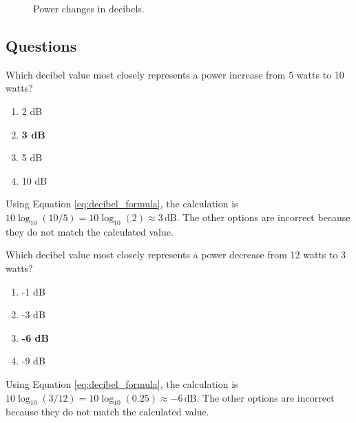 \begin{figure}[h]
    \centering
    \caption{Power changes in decibels.}
    \label{fig:decibel_power}
\end{figure}

\subsection*{Questions}
\begin{tcolorbox}[colback=gray!10!white,colframe=black!75!black,title={T5B09}]
    Which decibel value most closely represents a power increase from 5 watts to 10 watts?
    \begin{enumerate}[label=\Alph*),noitemsep]
        \item 2 dB
        \item \textbf{3 dB}
        \item 5 dB
        \item 10 dB
    \end{enumerate}
\end{tcolorbox}
Using Equation \ref{eq:decibel_formula}, the calculation is \( 10 \log_{10}(10/5) = 10 \log_{10}(2) \approx 3 \, \text{dB} \). The other options are incorrect because they do not match the calculated value.


\begin{tcolorbox}[colback=gray!10!white,colframe=black!75!black,title={T5B10}]
    Which decibel value most closely represents a power decrease from 12 watts to 3 watts?
    \begin{enumerate}[label=\Alph*),noitemsep]
        \item -1 dB
        \item -3 dB
        \item \textbf{-6 dB}
        \item -9 dB
    \end{enumerate}
\end{tcolorbox}
Using Equation \ref{eq:decibel_formula}, the calculation is \( 10 \log_{10}(3/12) = 10 \log_{10}(0.25) \approx -6 \, \text{dB} \). The other options are incorrect because they do not match the calculated value.

